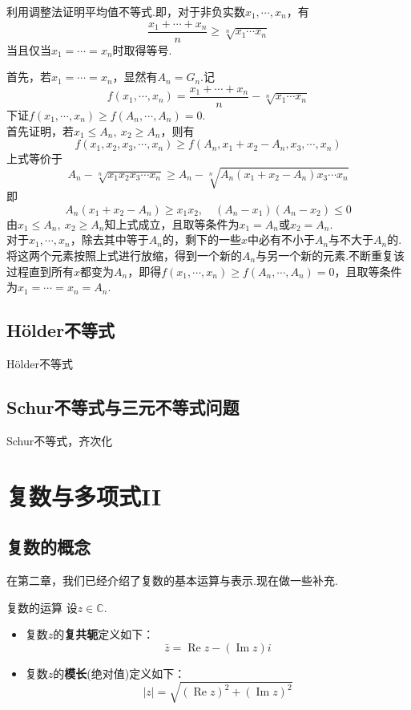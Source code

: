 \documentclass[lang=cn, zihao=5]{elegantbook}
\newcommand{\ssb}[1]{\left( #1 \right)}
\newcommand{\C}{\mathbb{C}}
\DeclareMathOperator{\CRe}{Re}
\DeclareMathOperator{\CIm}{Im}
\begin{document}
\begin{example}
	利用调整法证明平均值不等式.即，对于非负实数$x_1, \cdots ,x_n$，有$$\frac{x_1+ \cdots +x_n}{n} \geq \sqrt[n]{x_1 \cdots x_n}$$
	当且仅当$x_1 = \cdots =x_n$时取得等号.
\end{example}
\begin{solution}
	首先，若$x_1 = \cdots = x_n$，显然有$A_n=G_n$.记$$f(x_1, \cdots ,x_n) = \frac{x_1 + \cdots + x_n}{n} - \sqrt[n]{x_1 \cdots x_n}$$
	下证$f(x_1, \cdots ,x_n) \geq f(A_n, \cdots ,A_n) = 0$. \\
	首先证明，若$x_1 \leq A_n,~x_2 \geq A_n$，则有$$f(x_1,x_2,x_3, \cdots ,x_n) \geq f \ssb{A_n,x_1+x_2-A_n,x_3, \cdots ,x_n}$$
	上式等价于$$A_n - \sqrt[n]{x_1x_2x_3 \cdots x_n} \geq A_n - \sqrt[n]{A_n(x_1+x_2-A_n)x_3 \cdots x_n}$$
	即$$A_n(x_1+x_2-A_n) \geq x_1x_2,\quad (A_n-x_1)(A_n-x_2) \leq 0$$
	由$x_1 \leq A_n,~x_2 \geq A_n$知上式成立，且取等条件为$x_1=A_n$或$x_2=A_n$. \\
	对于$x_1, \cdots ,x_n$，除去其中等于$A_n$的，剩下的一些$x$中必有不小于$A_n$与不大于$A_n$的.将这两个元素按照上式进行放缩，得到一个新的$A_n$与另一个新的元素.不断重复该过程直到所有$x$都变为$A_n$，即得$f(x_1, \cdots ,x_n) \geq f(A_n, \cdots ,A_n) = 0$，且取等条件为$x_1 = \cdots = x_n = A_n$.
\end{solution}

\section{Hölder不等式}

Hölder不等式

\section{Schur不等式与三元不等式问题}

Schur不等式，齐次化

\chapter{复数与多项式II}

\section{复数的概念}

在第二章，我们已经介绍了复数的基本运算与表示.现在做一些补充.

\begin{definition}{复数的运算}
	设$z \in \C$.
	\begin{itemize}
		\item 复数$z$的\textbf{复共轭}定义如下：$$\bar{z} = \CRe z - (\CIm z) i$$
		\item 复数$z$的\textbf{模长}(绝对值)定义如下：$$|z| = \sqrt{(\CRe z)^2 + (\CIm z )^2}$$
	\end{itemize}
\end{definition}
\end{document}
